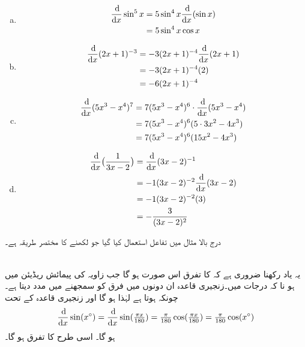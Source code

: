 \begin{enumerate}[a.]

\item
\begin{align*}
\frac{\dif}{\dif x}\sin^5x&=5\sin^4x\frac{\dif}{\dif x}(\sin x)\\
&=5\sin^4x\cos x
\end{align*}
\item
\begin{align*}
\frac{\dif}{\dif x}(2x+1)^{-3}&=-3(2x+1)^{-4}\frac{\dif}{\dif x}(2x+1)\\
&=-3(2x+1)^{-4}(2)\\
&=-6(2x+1)^{-4}
\end{align*}
\item
\begin{align*}
\frac{\dif}{\dif x}(5x^3-x^4)^7&=7(5x^3-x^4)^6\cdot \frac{\dif}{\dif x}(5x^3-x^4)\\
&=7(5x^3-x^4)^6(5\cdot 3x^2-4x^3)\\
&=7(5x^3-x^4)^6(15x^2-4x^3)
\end{align*}
\item
\begin{align*}
\frac{\dif}{\dif x}\big(\frac{1}{3x-2}\big)&=\frac{\dif}{\dif x}(3x-2)^{-1}\\
&=-1(3x-2)^{-2}\frac{\dif}{\dif x}(3x-2)\\
&=-1(3x-2)^{-2}(3)\\
&=-\frac{3}{(3x-2)^2}
\end{align*}
\end{enumerate}
درج بالا مثال میں تفاعل   استعمال کیا گیا جو  لکھنے کا مختصر طریقہ ہے۔

\\
یہ یاد رکھنا ضروری ہے کہ  کا تفرق اس صورت  ہو گا جب زاویہ کی پیمائش ریڈیئن میں ہو نا کہ درجات میں۔زنجیری قاعدہ ان دونوں میں فرق کو سمجھنے میں مدد دیتا ہے۔ چونکہ  ہوتا ہے
 لہٰذا  ہو گا اور زنجیری قاعدہ کے تحت
\begin{align*}
\frac{\dif}{\dif x}\sin(x^{\circ})=\frac{\dif}{\dif x}\sin (\tfrac{\pi x}{180})=\tfrac{\pi}{180}\cos (\tfrac{\pi x}{180})=\tfrac{\pi}{180}\cos (x^{\circ})
\end{align*}
ہو گا۔ اسی طرح  کا تفرق  ہو گا۔

